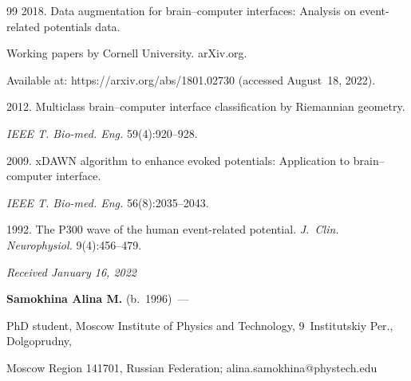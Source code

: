 {{\begin{thebibliography}{99}
 2018. Data augmentation for brain--computer interfaces: Analysis on event-related potentials data.

 Working papers by Cornell University. arXiv.org. 

 Available at: {\sf https://arxiv.org/abs/1801.02730} (accessed August~18, 2022).





 2012. Multiclass brain--computer interface classification by Riemannian geometry. 

 \textit{IEEE T. Bio-med. Eng.} 59(4):920--928.





 2009. xDAWN algorithm to enhance evoked potentials: Application to brain--computer interface. 

 \textit{IEEE T. Bio-med. Eng.} 56(8):2035--2043.




 1992. The P300 wave of the human event-related potential. \textit{J.~Clin. Neurophysiol.} 9(4):456--479.

 \end{thebibliography}

} }



\vspace*{-3pt}



\hfill{\small\textit{Received January 16, 2022}} 



\vspace*{-8pt} 



\Contr



\vspace*{-2pt}



\noindent

\textbf{Samokhina Alina M.} (b.\ 1996)~--- 

PhD student, Moscow Institute of Physics and Technology, 9~Institutskiy Per., Dolgoprudny, 

Moscow Region 141701, Russian Federation; \mbox{alina.samokhina@phystech.edu}



